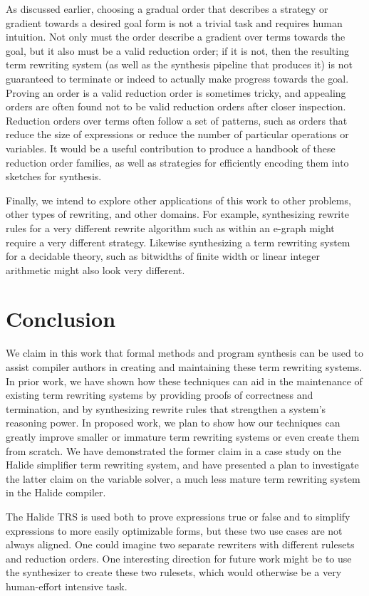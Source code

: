 As discussed earlier, choosing a gradual order that describes a strategy or gradient towards a desired goal form is not a trivial task and requires human intuition. Not only must the order describe a gradient over terms towards the goal, but it also must be a valid reduction order; if it is not, then the resulting term rewriting system (as well as the synthesis pipeline that produces it) is not guaranteed to terminate or indeed to actually make progress towards the goal. Proving an order is a valid reduction order is sometimes tricky, and appealing orders are often found not to be valid reduction orders after closer inspection. Reduction orders over terms often follow a set of patterns, such as orders that reduce the size of expressions or reduce the number of particular operations or variables. It would be a useful contribution to produce a handbook of these reduction order families, as well as strategies for efficiently encoding them into sketches for synthesis.

Finally, we intend to explore other applications of this work to other problems, other types of rewriting, and other domains. For example, synthesizing rewrite rules for a very different rewrite algorithm such as within an e-graph might require a very different strategy. Likewise synthesizing a term rewriting system for a decidable theory, such as bitwidths of finite width or linear integer arithmetic might also look very different.

\section{Conclusion}
We claim in this work that formal methods and program synthesis can be used to assist compiler authors in creating and maintaining these term rewriting systems. In prior work, we have shown how these techniques can aid in the maintenance of existing term rewriting systems by providing proofs of correctness and termination, and by synthesizing rewrite rules that strengthen a system's reasoning power. In proposed work, we plan to show how our techniques can greatly improve smaller or immature term rewriting systems or even create them from scratch. We have demonstrated the former claim in a case study on the Halide simplifier term rewriting system, and have presented a plan to investigate the latter claim on the variable solver, a much less mature term rewriting system in the Halide compiler.

The Halide TRS is used both to prove expressions true or false and to
simplify expressions to more easily optimizable forms, but these two use cases
are not always aligned. One could imagine two separate rewriters with
different rulesets and reduction orders. One interesting direction for future
work might be to use the synthesizer to create these two rulesets, which would
otherwise be a very human-effort intensive task.


